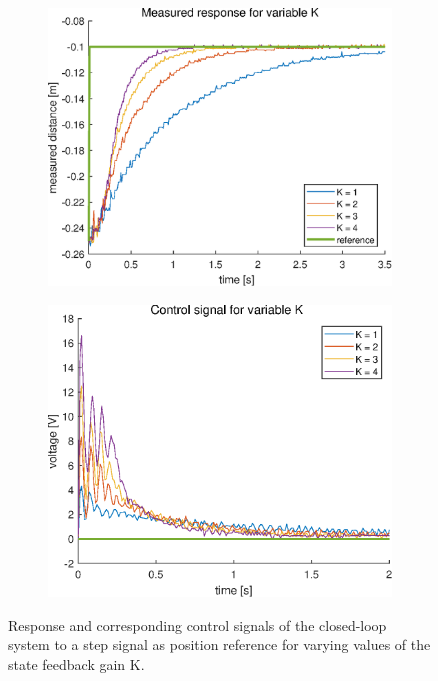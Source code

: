 \documentclass[a4paper,kul]{kulakarticle} %
\begin{document}
\begin{figure}[htp!]
	\centering
	\begin{subfigure}[b]{0.49\textwidth}
		\centering
		\includegraphics[width=\textwidth]{response_variable_K.eps}
	\end{subfigure}
	\hfill
	\begin{subfigure}[b]{0.478\textwidth}  
		\centering 
		\includegraphics[width=\textwidth]{voltage_variable_K.eps}
	\end{subfigure}
	\caption{Response and corresponding control signals of the closed-loop system to a step signal as position reference for varying values of the state feedback gain K.} 
	\label{fig:variable_K}
\end{figure}
\end{document}
